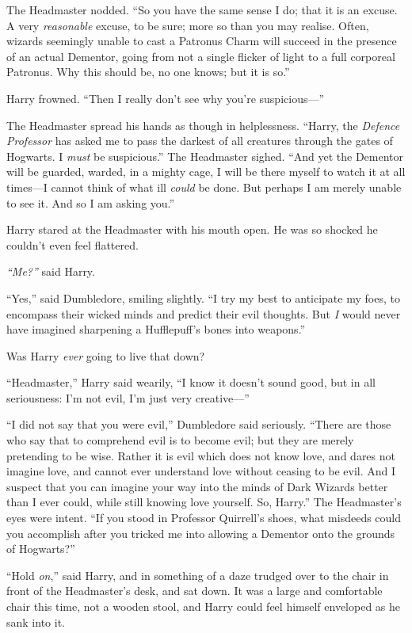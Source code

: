 The Headmaster nodded. ``So you have the same sense I do; that it is an
excuse. A very \emph{reasonable} excuse, to be sure; more so than you
may realise. Often, wizards seemingly unable to cast a Patronus Charm
will succeed in the presence of an actual Dementor, going from not a
single flicker of light to a full corporeal Patronus. Why this should
be, no one knows; but it is so.''

Harry frowned. ``Then I really don't see why you're suspicious---''

The Headmaster spread his hands as though in helplessness. ``Harry, the
\emph{Defence Professor} has asked me to pass the darkest of all
creatures through the gates of Hogwarts. I \emph{must} be suspicious.''
The Headmaster sighed. ``And yet the Dementor will be guarded, warded,
in a mighty cage, I will be there myself to watch it at all times---I
cannot think of what ill \emph{could} be done. But perhaps I am merely
unable to see it. And so I am asking you.''

Harry stared at the Headmaster with his mouth open. He was so shocked he
couldn't even feel flattered.

\emph{``Me?''} said Harry.

``Yes,'' said Dumbledore, smiling slightly. ``I try my best to
anticipate my foes, to encompass their wicked minds and predict their
evil thoughts. But \emph{I} would never have imagined sharpening a
Hufflepuff's bones into weapons.''

Was Harry \emph{ever} going to live that down?

``Headmaster,'' Harry said wearily, ``I know it doesn't sound good, but
in all seriousness: I'm not evil, I'm just very creative---''

``I did not say that you were evil,'' Dumbledore said seriously. ``There
are those who say that to comprehend evil is to become evil; but they
are merely pretending to be wise. Rather it is evil which does not know
love, and dares not imagine love, and cannot ever understand love
without ceasing to be evil. And I suspect that you can imagine your way
into the minds of Dark Wizards better than I ever could, while still
knowing love yourself. So, Harry.'' The Headmaster's eyes were intent.
``If you stood in Professor Quirrell's shoes, what misdeeds could you
accomplish after you tricked me into allowing a Dementor onto the
grounds of Hogwarts?''

``Hold \emph{on},'' said Harry, and in something of a daze trudged over
to the chair in front of the Headmaster's desk, and sat down. It was a
large and comfortable chair this time, not a wooden stool, and Harry
could feel himself enveloped as he sank into it.

